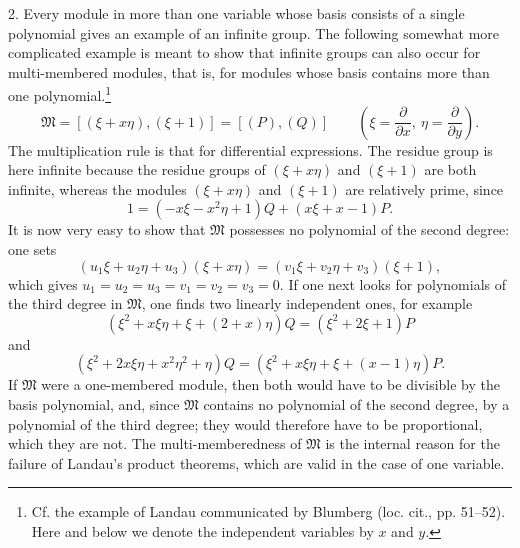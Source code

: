 \documentclass[11pt]{article}
\begin{document}
2. Every module in more than one variable whose basis consists of a single polynomial gives an example of an infinite group. The following somewhat more complicated example is meant to show that infinite groups can also occur for multi-membered modules, that is, for modules whose basis contains more than one polynomial.\footnote{Cf. the example of Landau communicated by Blumberg (loc. cit., pp. 51--52). Here and below we denote the independent variables by $x$ and $y$.}
\[
 \mathfrak M=[(\xi+x\eta),(\xi+1)]=[(P),(Q)]
 \qquad\left(\xi=\frac{\partial}{\partial x},\ \eta=\frac{\partial}{\partial y}\right).
\]
The multiplication rule is that for differential expressions. The residue group is here infinite because the residue groups of $(\xi+x\eta)$ and $(\xi+1)$ are both infinite, whereas the modules $(\xi+x\eta)$ and $(\xi+1)$ are relatively prime, since
\[
 1=(-x\xi-x^2\eta+1)Q+(x\xi+x-1)P.
\]
It is now very easy to show that $\mathfrak M$ possesses no polynomial of the second degree: one sets
\[
 (u_1\xi+u_2\eta+u_3)(\xi+x\eta)=(v_1\xi+v_2\eta+v_3)(\xi+1),
\]
which gives $u_1=u_2=u_3=v_1=v_2=v_3=0$. If one next looks for polynomials of the third degree in $\mathfrak M$, one finds two linearly independent ones, for example
\[
 (\xi^2+x\xi\eta+\xi+(2+x)\eta)Q=(\xi^2+2\xi+1)P
\]
and
\[
 (\xi^2+2x\xi\eta+x^2\eta^2+\eta)Q
 =(\xi^2+x\xi\eta+\xi+(x-1)\eta)P.
\]
If $\mathfrak M$ were a one-membered module, then both would have to be divisible by the basis polynomial, and, since $\mathfrak M$ contains no polynomial of the second degree, by a polynomial of the third degree; they would therefore have to be proportional, which they are not. The multi-memberedness of $\mathfrak M$ is the internal reason for the failure of Landau's product theorems, which are valid in the case of one variable.
\end{document}
